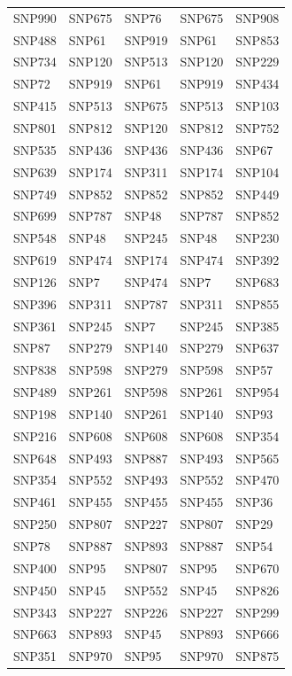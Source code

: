\begin{table}[ht]
\begin{tabular}{lllll}
  SNP990 & SNP675 & SNP76 & SNP675 & SNP908 \\ 
  SNP488 & SNP61 & SNP919 & SNP61 & SNP853 \\ 
  SNP734 & SNP120 & SNP513 & SNP120 & SNP229 \\ 
  SNP72 & SNP919 & SNP61 & SNP919 & SNP434 \\ 
  SNP415 & SNP513 & SNP675 & SNP513 & SNP103 \\ 
  SNP801 & SNP812 & SNP120 & SNP812 & SNP752 \\ 
  SNP535 & SNP436 & SNP436 & SNP436 & SNP67 \\ 
  SNP639 & SNP174 & SNP311 & SNP174 & SNP104 \\ 
  SNP749 & SNP852 & SNP852 & SNP852 & SNP449 \\ 
  SNP699 & SNP787 & SNP48 & SNP787 & SNP852 \\ 
  SNP548 & SNP48 & SNP245 & SNP48 & SNP230 \\ 
  SNP619 & SNP474 & SNP174 & SNP474 & SNP392 \\ 
  SNP126 & SNP7 & SNP474 & SNP7 & SNP683 \\ 
  SNP396 & SNP311 & SNP787 & SNP311 & SNP855 \\ 
  SNP361 & SNP245 & SNP7 & SNP245 & SNP385 \\ 
  SNP87 & SNP279 & SNP140 & SNP279 & SNP637 \\ 
  SNP838 & SNP598 & SNP279 & SNP598 & SNP57 \\ 
  SNP489 & SNP261 & SNP598 & SNP261 & SNP954 \\ 
  SNP198 & SNP140 & SNP261 & SNP140 & SNP93 \\ 
  SNP216 & SNP608 & SNP608 & SNP608 & SNP354 \\ 
  SNP648 & SNP493 & SNP887 & SNP493 & SNP565 \\ 
  SNP354 & SNP552 & SNP493 & SNP552 & SNP470 \\ 
  SNP461 & SNP455 & SNP455 & SNP455 & SNP36 \\ 
  SNP250 & SNP807 & SNP227 & SNP807 & SNP29 \\ 
  SNP78 & SNP887 & SNP893 & SNP887 & SNP54 \\ 
  SNP400 & SNP95 & SNP807 & SNP95 & SNP670 \\ 
  SNP450 & SNP45 & SNP552 & SNP45 & SNP826 \\ 
  SNP343 & SNP227 & SNP226 & SNP227 & SNP299 \\ 
  SNP663 & SNP893 & SNP45 & SNP893 & SNP666 \\ 
  SNP351 & SNP970 & SNP95 & SNP970 & SNP875 \\ 

\end{tabular}
\end{table}
